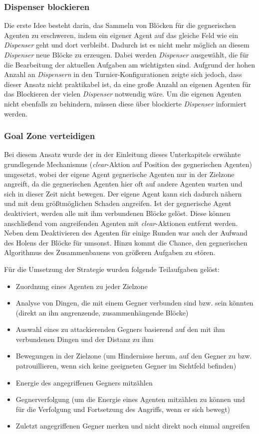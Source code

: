 \documentclass[runningheads]{llncs}
\begin{document}
\subsubsection{Dispenser blockieren}
Die erste Idee besteht darin, das Sammeln von Blöcken für die gegnerischen Agenten zu erschweren, indem ein eigener Agent auf das gleiche Feld wie ein \textit{Dispenser} geht und dort verbleibt. Dadurch ist es nicht mehr möglich an diesem \textit{Dispenser} neue Blöcke zu erzeugen. Dabei werden \textit{Dispenser} ausgewählt, die für die Bearbeitung der aktuellen Aufgaben am wichtigsten sind. Aufgrund der hohen Anzahl an \textit{Dispensern} in den Turnier-Konfigurationen zeigte sich jedoch, dass dieser Ansatz nicht praktikabel ist, da eine große Anzahl an eigenen Agenten für das Blockieren der vielen \textit{Dispenser} notwendig wäre. Um die eigenen Agenten nicht ebenfalls zu behindern, müssen diese über blockierte \textit{Dispenser} informiert werden.

\subsubsection{Goal Zone verteidigen}
Bei diesem Ansatz wurde der in der Einleitung dieses Unterkapitels erwähnte grundlegende Mechanismus (\textit{clear}-Aktion auf Position des gegnerischen Agenten) umgesetzt, wobei der eigene Agent gegnerische Agenten nur in der Zielzone angreift, da die gegnerischen Agenten hier oft auf andere Agenten warten und sich in dieser Zeit nicht bewegen. Der eigene Agent kann sich dadurch nähern und mit dem größtmöglichen Schaden angreifen. Ist der gegnerische Agent deaktiviert, werden alle mit ihm verbundenen Blöcke gelöst. Diese können anschließend vom angreifenden Agenten mit \textit{clear}-Aktionen entfernt werden. Neben dem Deaktivieren des Agenten für einige Runden war auch der Aufwand des Holens der Blöcke für umsonst. Hinzu kommt die Chance, den gegnerischen Algorithmus des Zusammenbauens von größeren Aufgaben zu stören.

Für die Umsetzung der Strategie wurden folgende Teilaufgaben gelöst:
\begin{itemize}
\item{Zuordnung eines Agenten zu jeder Zielzone}
\item{Analyse von Dingen, die mit einem Gegner verbunden sind bzw. sein könnten (direkt an ihn angrenzende, zusammenhängende Blöcke)}
\item{Auswahl eines zu attackierenden Gegners basierend auf den mit ihm verbundenen Dingen und der Distanz zu ihm}
\item{Bewegungen in der Zielzone (um Hindernisse herum, auf den Gegner zu bzw. patrouillieren, wenn sich keine geeigneten Gegner im Sichtfeld befinden)}
\item{Energie des angegriffenen Gegners mitzählen}
\item{Gegnerverfolgung (um die Energie eines Agenten mitzählen zu können und für die Verfolgung und Fortsetzung des Angriffs, wenn er sich bewegt)}
\item{Zuletzt angegriffenen Gegner merken und nicht direkt noch einmal angreifen}
\end{itemize}
\end{document}
